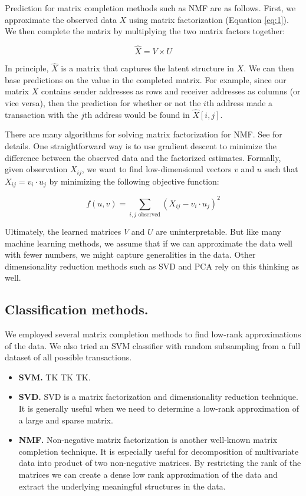 \documentclass{article} %
\begin{document}
Prediction for matrix completion methods such as NMF are as follows. First, we approximate the observed data $X$ using matrix factorization (Equation \ref{eq:1}). We then complete the matrix by multiplying the two matrix factors together:

$$
\hat{X} = V \times U
$$

In principle, $\hat{X}$ is a matrix that captures the latent structure in $X$. We can then base predictions on the value in the completed matrix. For example, since our matrix $X$ contains sender addresses as rows and receiver addresses as columns (or vice versa), then the prediction for whether or not the $i$th address made a transaction with the $j$th address would be found in $\hat{X}[i, j]$.

There are many algorithms for solving matrix factorization for NMF. See \cite{lee2001algorithms} for details. One straightforward way is to use gradient descent to minimize the difference between the observed data and the factorized estimates. Formally, given observation $X_{ij}$, we want to find low-dimensional vectors $v$ and $u$ such that $X_{ij} = v_i \cdot  u_j$ by minimizing the following objective function:

$$
f(u, v) = \sum_{i,j \text{ observed}} (X_{ij} - v_i \cdot u_j)^2
$$

Ultimately, the learned matrices $V$ and $U$ are uninterpretable. But like many machine learning methods, we assume that if we can approximate the data well with fewer numbers, we might capture generalities in the data. Other dimensionality reduction methods such as SVD and PCA rely on this thinking as well.

\subsection{Classification methods.} We employed several matrix completion methods to find low-rank approximations of the data. We also tried an SVM classifier with random subsampling from a full dataset of all possible transactions.

\begin{itemize}

\item \textbf{SVM.} TK TK TK.

\item \textbf{SVD.} SVD is a matrix factorization and dimensionality reduction technique. It is generally useful when we need to determine a low-rank approximation of a large and sparse matrix.     

\item \textbf{NMF.} Non-negative matrix factorization is another well-known matrix completion technique. It is especially useful for decomposition of multivariate data into product of two non-negative matrices. By restricting the rank of the matrices we can create a dense low rank approximation of the data and extract the underlying meaningful structures in the data.

\end{itemize}
\end{document}

